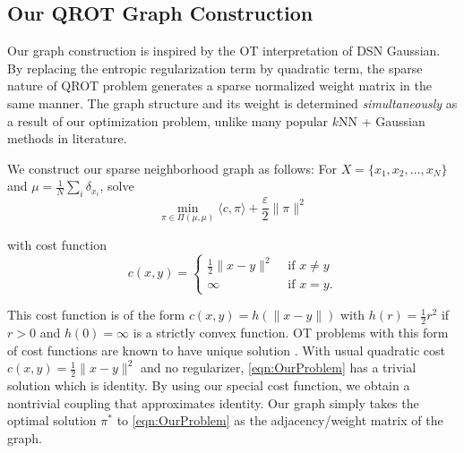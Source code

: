 \documentclass{article}
\newcommand{\half}{\frac{1}{2}}
\begin{document}
\subsection{Our QROT Graph Construction}\label{sec:QROTgraph}

Our graph construction is inspired by the OT interpretation of DSN Gaussian. 
By replacing the entropic regularization term by quadratic term, the sparse nature of QROT problem generates a sparse normalized weight matrix in the same manner.
The graph structure and its weight is determined \textit{simultaneously} as a result of our optimization problem, unlike many popular $k$NN + Gaussian methods in literature.

We construct our sparse neighborhood graph as follows:
For $X = \{x_1, x_2, \ldots, x_N\}$ and $\mu = \frac{1}{N} \sum_i \delta_{x_i}$, solve
\begin{equation}\label{eqn:OurProblem}
    \min_{\pi \in \Pi(\mu,\mu)} \langle c , \pi \rangle + \frac{\varepsilon}{2} \|\pi\|^2
\end{equation}

with cost function 
\begin{equation}\label{eqn:OurCost}
    c(x, y) =
    \begin{cases}
        \half\|x-y\|^2 & \text{ if } x\neq y \\
        \infty  & \text{ if } x = y.
    \end{cases}
\end{equation}

This cost function is of the form $c(x, y) = h(\|x-y\|)$ with 
$h(r) = \half r^2$ if $r>0$ and $h(0)=\infty$ is a strictly convex function.
OT problems with this form of cost functions are known to have unique solution \cite{cavalletti2015existence}. 
With usual quadratic cost $c(x, y) = \half\|x-y\|^2$ and no regularizer, \eqref{eqn:OurProblem} has a trivial solution which is identity. 
By using our special cost function, we obtain a nontrivial coupling that approximates identity. 
Our graph simply takes the optimal solution $\pi^*$ to \eqref{eqn:OurProblem} as the adjacency/weight matrix of the graph. 
\end{document}
